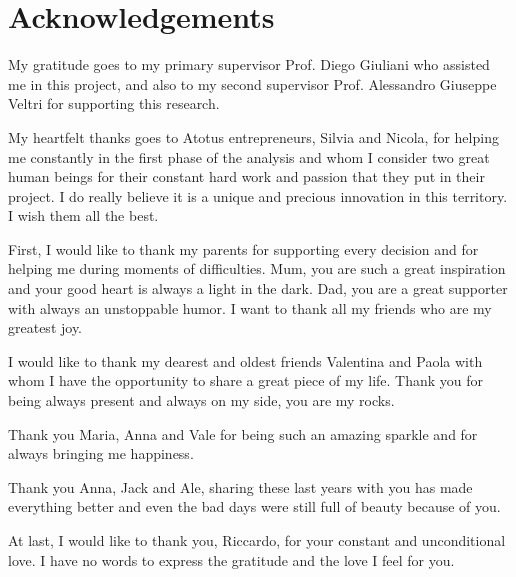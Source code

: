 \documentclass[%
    corpo=11pt,
    twoside, %
    oldstyle,
    autoretitolo,
    greek,
    evenboxes,
]{toptesi}
\begin{document}
\backmatter



\printbibliography[heading=bibintoc]

\chapter*{Acknowledgements}
\thispagestyle{empty}

My gratitude goes to my primary supervisor Prof. Diego Giuliani who assisted me in this project, and also to my second supervisor Prof. Alessandro Giuseppe Veltri for supporting this research.

My heartfelt thanks goes to Atotus entrepreneurs, Silvia and Nicola, for helping me constantly in the first phase of the analysis and whom I consider two great human beings for their constant hard work and passion that they put in their project. I do really believe it is a unique and precious innovation in this territory. I wish them all the best.

First, I would like to thank my parents for supporting every decision and for helping me during moments of difficulties. Mum, you are such a great inspiration and your good heart is always a light in the dark. Dad, you are a great supporter with always an unstoppable humor.
I want to thank all my friends who are my greatest joy. 

I would like to thank my dearest and oldest friends Valentina and Paola with whom I have the opportunity to share a great piece of my life. Thank you for being always present and always on my side, you are my rocks.

Thank you Maria, Anna and Vale for being such an amazing sparkle and for always bringing me happiness. 

Thank you Anna, Jack and Ale, sharing these last years with you has made everything better and even the bad days were still full of beauty because of you.

At last, I would like to thank you, Riccardo, for your constant and unconditional love. I have no words to express the gratitude and the love I feel for you. 





\end{document}
